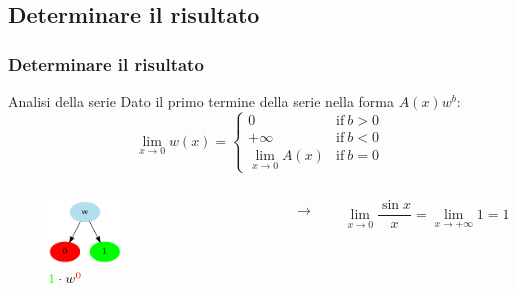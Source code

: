 \documentclass[aspectratio=149]{beamer}
\begin{document}
	\subsection{Determinare il risultato}
	
	\begin{frame}
		\frametitle{Determinare il risultato}
		\begin{block}{Analisi della serie}
			Dato il primo termine della serie nella forma \(A(x)w^b\):
			\[
			\lim_{x \to 0}{w(x)} = \begin{cases}
				0 &\text{if} \: b > 0 \\
				+\infty &\text{if} \: b < 0\\
				\lim_{x \to 0}{A(x)} &\text{if} \: b = 0
			\end{cases}
			\]
		\end{block}
	\end{frame}

	\begin{frame}
		\begin{columns}
			\begin{column}{0.45\textwidth}
				\begin{figure}
					\includegraphics[width=0.4\textwidth]{pres_img/series.png}
					\caption{\(\textcolor{green}{1} \cdot w^{\textcolor{red}{0}}\)}
				\end{figure}
			\end{column}
			\begin{column}{0.1\textwidth}
				\begin{center}
					$\rightarrow$
				\end{center}
			\end{column}
			\begin{column}{0.45\textwidth}
				\begin{center}
					\[
						\lim_{x \to 0}{\frac{\sin{x}}{x}} = \lim_{x \to +\infty}{1} = 1
					\]
				\end{center}
			\end{column}
		\end{columns}
	\end{frame}
	
\end{document}
